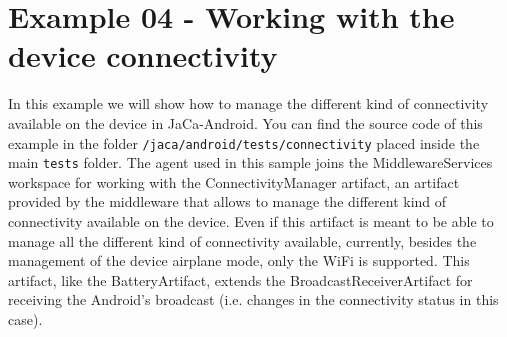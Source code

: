 \documentclass[11pt]{report}
\newcommand\code[1]{{\mbox{\texttt{{#1}}}}}
\newcommand{\jacandroid}{\textsf{JaCa-Android}}
\begin{document}
\section{Example 04 - Working with the device connectivity}

In this example we will show how to manage the different kind of connectivity available on the device in \jacandroid{}. You can find the source code of this example in the folder \code{/jaca/android/tests/connectivity} placed inside the main \code{tests} folder. The agent used in this sample joins the \mbox{\textsf{MiddlewareServices}} workspace for working with the \mbox{\textsf{ConnectivityManager}} artifact, an artifact provided by the middleware that allows to manage the different kind of connectivity available on the device. Even if this artifact is meant to be able to manage all the different kind of connectivity available, currently, besides the management of the device airplane mode, only the WiFi is supported. This artifact, like the \textsf{BatteryArtifact}, extends the \textsf{BroadcastReceiverArtifact} for receiving the Android's broadcast (i.e. changes in the connectivity status in this case).
\end{document}
